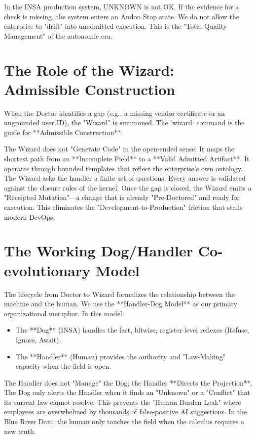 \documentclass[12pt,a4paper,oneside]{book}
\begin{document}
In the INSA production system, UNKNOWN is not OK. If the evidence for a check is missing, the system enters an Andon Stop state. We do not allow the enterprise to "drift" into unadmitted execution. This is the "Total Quality Management" of the autonomic era.

\section{The Role of the Wizard: Admissible Construction}
When the Doctor identifies a gap (e.g., a missing vendor certificate or an ungrounded user ID), the "Wizard" is summoned. The `wizard` command is the guide for **Admissible Construction**. 

The Wizard does not "Generate Code" in the open-ended sense. It maps the shortest path from an **Incomplete Field** to a **Valid Admitted Artifact**. It operates through bounded templates that reflect the enterprise's own ontology. The Wizard asks the handler a finite set of questions. Every answer is validated against the closure rules of the kernel. Once the gap is closed, the Wizard emits a "Receipted Mutation"---a change that is already "Pre-Doctored" and ready for execution. This eliminates the "Development-to-Production" friction that stalls modern DevOps.

\section{The Working Dog/Handler Co-evolutionary Model}
The lifecycle from Doctor to Wizard formalizes the relationship between the machine and the human. We use the **Handler-Dog Model** as our primary organizational metaphor. In this model:
\begin{itemize}
    \item The **Dog** (INSA) handles the fast, bitwise, register-level reflexes (Refuse, Ignore, Await).
    \item The **Handler** (Human) provides the authority and "Law-Making" capacity when the field is open.
\end{itemize}

The Handler does not "Manage" the Dog; the Handler **Directs the Projection**. The Dog only alerts the Handler when it finds an "Unknown" or a "Conflict" that its current law cannot resolve. This prevents the "Human Burden Leak" where employees are overwhelmed by thousands of false-positive AI suggestions. In the Blue River Dam, the human only touches the field when the calculus requires a new truth.
\end{document}
